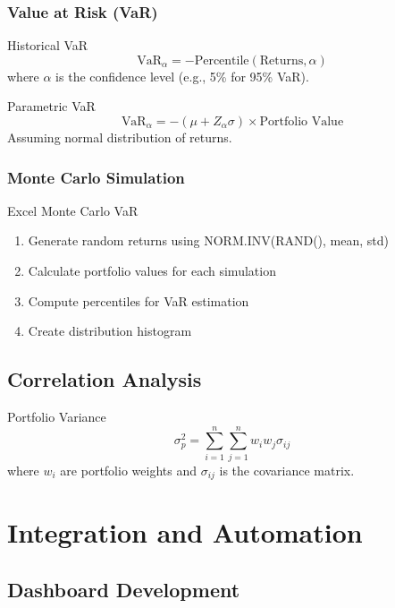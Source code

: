 \documentclass[12pt,a4paper]{book}
\begin{document}
{{\subsubsection{Value at Risk (VaR)}

\begin{definition}{Historical VaR}
\[
\text{VaR}_{\alpha} = -\text{Percentile}(\text{Returns}, \alpha)
\]
where $\alpha$ is the confidence level (e.g., 5\% for 95\% VaR).
\end{definition}

\begin{definition}{Parametric VaR}
\[
\text{VaR}_{\alpha} = -(\mu + Z_{\alpha} \sigma) \times \text{Portfolio Value}
\]
Assuming normal distribution of returns.
\end{definition}

\subsubsection{Monte Carlo Simulation}

\begin{example}{Excel Monte Carlo VaR}
\begin{enumerate}
    \item Generate random returns using NORM.INV(RAND(), mean, std)
    \item Calculate portfolio values for each simulation
    \item Compute percentiles for VaR estimation
    \item Create distribution histogram
\end{enumerate}
\end{example}

\subsection{Correlation Analysis}

\begin{definition}{Portfolio Variance}
\[
\sigma_p^2 = \sum_{i=1}^{n} \sum_{j=1}^{n} w_i w_j \sigma_{ij}
\]
where $w_i$ are portfolio weights and $\sigma_{ij}$ is the covariance matrix.
\end{definition}

\section{Integration and Automation}

\subsection{Dashboard Development}

}}
\end{document}
